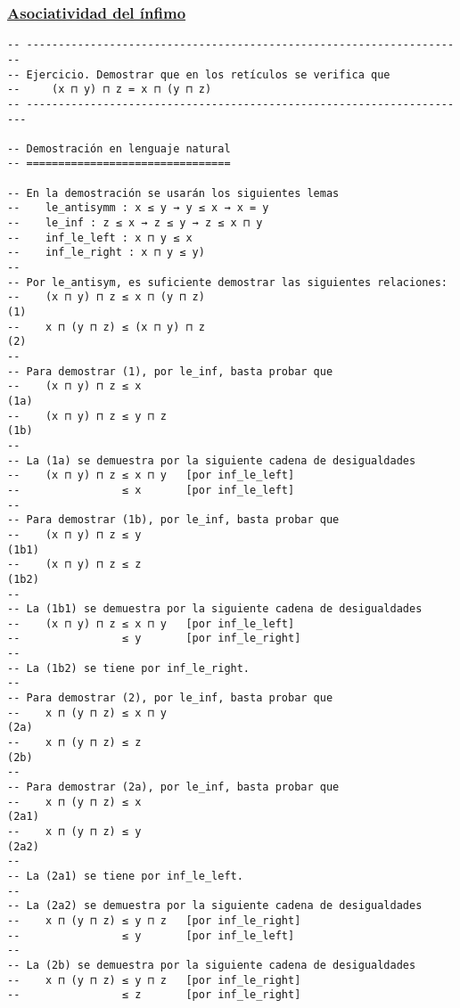 \subsubsection{\href{./src/Basicos/Asociatividad\_del\_infimo.lean}{Asociatividad del ínfimo}}
\label{sec:org6d1db5f}
\begin{verbatim}
-- ---------------------------------------------------------------------
-- Ejercicio. Demostrar que en los retículos se verifica que
--     (x ⊓ y) ⊓ z = x ⊓ (y ⊓ z)
-- ----------------------------------------------------------------------

-- Demostración en lenguaje natural
-- ================================

-- En la demostración se usarán los siguientes lemas
--    le_antisymm : x ≤ y → y ≤ x → x = y
--    le_inf : z ≤ x → z ≤ y → z ≤ x ⊓ y
--    inf_le_left : x ⊓ y ≤ x
--    inf_le_right : x ⊓ y ≤ y)
--
-- Por le_antisym, es suficiente demostrar las siguientes relaciones:
--    (x ⊓ y) ⊓ z ≤ x ⊓ (y ⊓ z)                                      (1)
--    x ⊓ (y ⊓ z) ≤ (x ⊓ y) ⊓ z                                      (2)
--
-- Para demostrar (1), por le_inf, basta probar que
--    (x ⊓ y) ⊓ z ≤ x                                               (1a)
--    (x ⊓ y) ⊓ z ≤ y ⊓ z                                           (1b)
--
-- La (1a) se demuestra por la siguiente cadena de desigualdades
--    (x ⊓ y) ⊓ z ≤ x ⊓ y   [por inf_le_left]
--                ≤ x       [por inf_le_left]
--
-- Para demostrar (1b), por le_inf, basta probar que
--    (x ⊓ y) ⊓ z ≤ y                                              (1b1)
--    (x ⊓ y) ⊓ z ≤ z                                              (1b2)
--
-- La (1b1) se demuestra por la siguiente cadena de desigualdades
--    (x ⊓ y) ⊓ z ≤ x ⊓ y   [por inf_le_left]
--                ≤ y       [por inf_le_right]
--
-- La (1b2) se tiene por inf_le_right.
--
-- Para demostrar (2), por le_inf, basta probar que
--    x ⊓ (y ⊓ z) ≤ x ⊓ y                                           (2a)
--    x ⊓ (y ⊓ z) ≤ z                                               (2b)
--
-- Para demostrar (2a), por le_inf, basta probar que
--    x ⊓ (y ⊓ z) ≤ x                                              (2a1)
--    x ⊓ (y ⊓ z) ≤ y                                              (2a2)
--
-- La (2a1) se tiene por inf_le_left.
--
-- La (2a2) se demuestra por la siguiente cadena de desigualdades
--    x ⊓ (y ⊓ z) ≤ y ⊓ z   [por inf_le_right]
--                ≤ y       [por inf_le_left]
--
-- La (2b) se demuestra por la siguiente cadena de desigualdades
--    x ⊓ (y ⊓ z) ≤ y ⊓ z   [por inf_le_right]
--                ≤ z       [por inf_le_right]


\end{verbatim}
